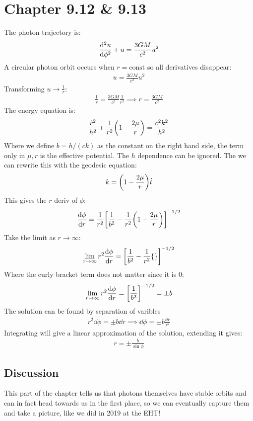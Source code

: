 \documentclass[12pt]{article}
\begin{document}
\section{Chapter 9.12 \& 9.13}
The photon trajectory is:
\begin{align*}
  \dv[2]{u}{\phi}+u=\frac{3GM}{c^2}u^2
\end{align*}
A circular photon orbit occurs when $r=\text{const}$ so all derivatives disappear:
\begin{align*}
  u=\frac{3GM}{c^2}u^2
\end{align*}
Transforming $u\to\frac{1}{r}$:
\begin{align*}
  \frac{1}{r}=\frac{3GM}{c^2}\frac{1}{r^2}\implies r=\frac{3GM}{c^2}
\end{align*}
The energy equation is:
\begin{align*}
  \frac{\dot{r}^2}{h^2}+\frac{1}{r^2}\qty(1-\frac{2\mu}{r})=\frac{c^2k^2}{h^2}
\end{align*}
Where we define $b=h/(ck)$ as the constant on the right hand side, the term only in $\mu,r$ is the effective potential. The $h$ dependence can be ignored. The we can rewrite this with the geodesic equation:
\begin{align*}
  k=\qty(1-\frac{2\mu}{r})\dot{t}
\end{align*}
This gives the $r$ deriv of $\phi$:
\begin{align*}
  \dv{\phi}{r}=\frac{1}{r^2}
  \qty[\frac{1}{b^2}-\frac{1}{r^2}\qty(1-\frac{2\mu}{r})]^{-1/2}
\end{align*}
Take the limit as $r\to\infty:$
\begin{align*}
  \lim_{r\to\infty}r^2\dv{\phi}{r}=\qty[\frac{1}{b^2}-\frac{1}{r^2}\{\}]^{-1/2}
\end{align*}
Where the curly bracket term does not matter since it is $0$:
\begin{align*}
  \lim_{r\to\infty}r^2\dv{\phi}{r}=\qty[\frac{1}{b^2}]^{-1/2}=\pm b
\end{align*}
The solution can be found by separation of varibles
\begin{align*}
  r^2\dd{\phi}=\pm b\dd{r}\implies\dd{\phi}=\pm b\frac{\dd{r}}{r^2}
\end{align*}
Integrating will give a linear approximation of the solution, extending it gives:
\begin{align*}
  r=\pm\frac{b}{\sin\phi}
\end{align*}
\subsection{Discussion}
This part of the chapter tells us that photons themselves have stable orbits and can in fact head towards us in the first place, so we can eventually capture them and take a picture, like we did in 2019 at the EHT!
\end{document}
